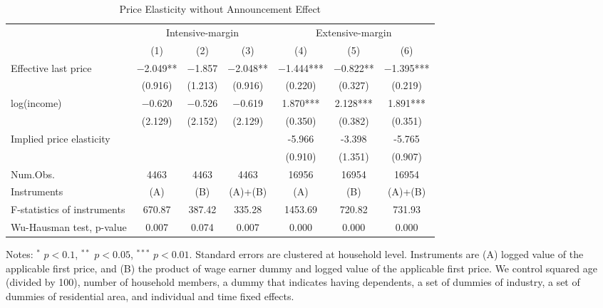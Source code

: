 \begin{table}

\caption{Price Elasticity without Announcement Effect \label{tab:announcement-effect}}
\centering
\begin{threeparttable}
\begin{tabular}[t]{lcccccc}
\toprule
\multicolumn{1}{c}{ } & \multicolumn{3}{c}{Intensive-margin} & \multicolumn{3}{c}{Extensive-margin} \\
\cmidrule(l{3pt}r{3pt}){2-4} \cmidrule(l{3pt}r{3pt}){5-7}
  & (1) & (2) & (3) & (4) & (5) & (6)\\
\midrule
Effective last price & \num{-2.049}** & \num{-1.857} & \num{-2.048}** & \num{-1.444}*** & \num{-0.822}** & \num{-1.395}***\\
 & (\num{0.916}) & (\num{1.213}) & (\num{0.916}) & (\num{0.220}) & (\num{0.327}) & (\num{0.219})\\
log(income) & \num{-0.620} & \num{-0.526} & \num{-0.619} & \num{1.870}*** & \num{2.128}*** & \num{1.891}***\\
 & (\num{2.129}) & (\num{2.152}) & (\num{2.129}) & (\num{0.350}) & (\num{0.382}) & (\num{0.351})\\
\midrule
Implied price elasticity &  &  &  & -5.966 & -3.398 & -5.765\\
 &  &  &  & (0.910) & (1.351) & (0.907)\\
Num.Obs. & \num{4463} & \num{4463} & \num{4463} & \num{16956} & \num{16954} & \num{16954}\\
Instruments & (A) & (B) & (A)+(B) & (A) & (B) & (A)+(B)\\
F-statistics of instruments & 670.87 & 387.42 & 335.28 & 1453.69 & 720.82 & 731.93\\
Wu-Hausman test, p-value & 0.007 & 0.074 & 0.007 & 0.000 & 0.000 & 0.000\\
\bottomrule
\end{tabular}
\begin{tablenotes}
\item Notes: $^{*}$ $p < 0.1$, $^{**}$ $p < 0.05$, $^{***}$ $p < 0.01$. Standard errors are clustered at household level. Instruments are (A) logged value of the applicable first price, and (B) the product of wage earner dummy and logged value of the applicable first price. We control squared age (divided by 100), number of household members, a dummy that indicates having dependents, a set of dummies of industry, a set of dummies of residential area, and individual and time fixed effects.
\end{tablenotes}
\end{threeparttable}
\end{table}
